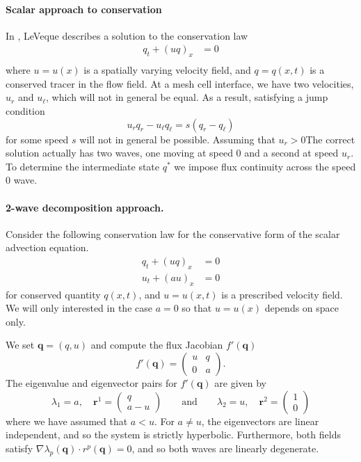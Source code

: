 \documentclass{article}
\begin{document}
\paragraph{Scalar approach to conservation}
In \cite{le:2002}, LeVeque describes a solution to the conservation law
\begin{align}
q_t + (uq)_x &= 0 \\
\end{align}
where $u = u(x)$ is a spatially varying velocity field, and $q = q(x,t)$ is a conserved 
tracer in  the flow field.  At a mesh cell interface, we have two velocities, 
$u_r$ and $u_\ell$, which will not in general be equal.  As a result, satisfying a jump
condition 
\begin{equation}
u_r q_r - u_\ell q_\ell = s(q_r - q_\ell)
\end{equation}
for some speed $s$ will not in general be possible.   Assuming that $u_r > 0$The correct solution actually has two waves, one moving at speed 0 and a second at speed $u_r$.  To determine the 
intermediate state $q^*$ we impose flux continuity across the speed 0 wave.
\begin{equation}
\end{equation}


\paragraph{2-wave decomposition approach.}
Consider the following conservation law for the conservative form of the scalar advection equation.
\begin{align}
q_t + (uq)_x &= 0 \\
u_t + (au)_x & = 0
\end{align}
for conserved quantity $q(x,t)$, and  $u = u(x,t)$ is a prescribed velocity field.  We will only 
interested in the case $a = 0$ so that $u = u(x)$ depends on space only.

We set $\mathbf q = (q,u)$ and compute the flux Jacobian $f'(\mathbf q)$
\begin{equation}
f'(\mathbf q) = \left(\begin{array}{rr} u & q \\ 0 & a\end{array}\right).
\end{equation}
The eigenvalue and eigenvector pairs for $f'(\mathbf q)$ are given by
\begin{equation}
\lambda_1 = a,  \quad  {\mathbf r}^1 = \left(\begin{array}{c} q \\ a-u\end{array}\right) \qquad \mbox{and} \qquad
\lambda_2 = u,  \quad  {\mathbf r}^2 = \left(\begin{array}{c} 1 \\ 0\end{array}\right)
\end{equation}
where we have assumed that $a < u$.  For $a \ne u$, the eigenvectors are linear independent, and so the system is strictly hyperbolic.  Furthermore, both fields satisfy $\nabla \lambda_p(\mathbf q) \cdot r^p(\mathbf q) = 0$, and so both waves are linearly degenerate.  
\end{document}
